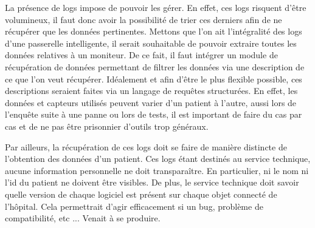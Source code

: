 La présence de logs impose de pouvoir les gérer. En effet, ces logs risquent d'être volumineux, il faut donc avoir la
possibilité de trier ces derniers afin de ne récupérer que les données pertinentes. Mettons que l'on ait l'intégralité des logs
d'une passerelle intelligente, il serait souhaitable de pouvoir extraire toutes les données relatives à un moniteur. De ce fait,
il faut intégrer un module de récupération de données permettant de filtrer les données via une description de ce que l'on veut
récupérer. Idéalement et afin d'être le plus flexible possible, ces descriptions seraient faites via un langage de requêtes
structurées. En effet, les données et capteurs utilisés peuvent varier d'un patient à l'autre, aussi lors de l'enquête suite à une
panne ou lors de tests, il est important de faire du cas par cas et de ne pas être prisonnier d'outils trop généraux.
\newline

Par ailleurs, la récupération de ces logs doit se faire de manière distincte de l'obtention des données d'un patient. Ces logs
étant destinés au service technique, aucune information personnelle ne doit transparaître. En particulier, ni le nom ni l'id du
patient ne doivent être visibles. De plus, le service technique doit savoir quelle version de chaque logiciel est présent sur
chaque objet connecté de l'hôpital. Cela permettrait d'agir efficacement si un bug, problème de compatibilité, etc ... Venait à se
produire.
\newline

